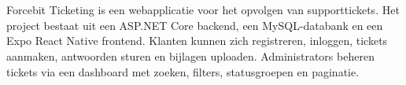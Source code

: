 ﻿%

%
%
%
%
%

%



\chapter*{}

Forcebit Ticketing is een webapplicatie voor het opvolgen van supporttickets. Het project bestaat uit een ASP.NET Core backend, een MySQL-databank en een Expo React Native frontend. Klanten kunnen zich registreren, inloggen, tickets aanmaken, antwoorden sturen en bijlagen uploaden. Administrators beheren tickets via een dashboard met zoeken, filters, statusgroepen en paginatie.

